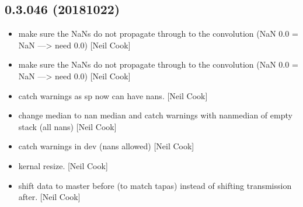 \documentclass[a4paper,10pt,english]{report}
\begin{document}
\subsection{0.3.046 (2018\sphinxhyphen{}10\sphinxhyphen{}22)}
\label{\detokenize{misc/changelog:id304}}\begin{itemize}
\item {} 
 \sphinxhyphen{} make sure the NaNs do not propagate through to the
convolution (NaN \sphinxtitleref{*} 0.0 = NaN —\textgreater{} need 0.0) {[}Neil Cook{]}

\item {} 
 \sphinxhyphen{} make sure the NaNs do not propagate through to the
convolution (NaN \sphinxtitleref{*} 0.0 = NaN —\textgreater{} need 0.0) {[}Neil Cook{]}

\item {} 
 \sphinxhyphen{} catch warnings as sp now can have nans. {[}Neil Cook{]}

\item {} 
 \sphinxhyphen{} change median to nan median and catch
warnings with nanmedian of empty stack (all nans) {[}Neil Cook{]}

\item {} 
 \sphinxhyphen{} catch warnings in dev (nans allowed) {[}Neil Cook{]}

\item {} 
 \sphinxhyphen{} kernal resize. {[}Neil Cook{]}

\item {} 
 \sphinxhyphen{} shift data to master before (to match tapas) \sphinxhyphen{}
instead of shifting transmission after. {[}Neil Cook{]}

\end{itemize}
\end{document}
